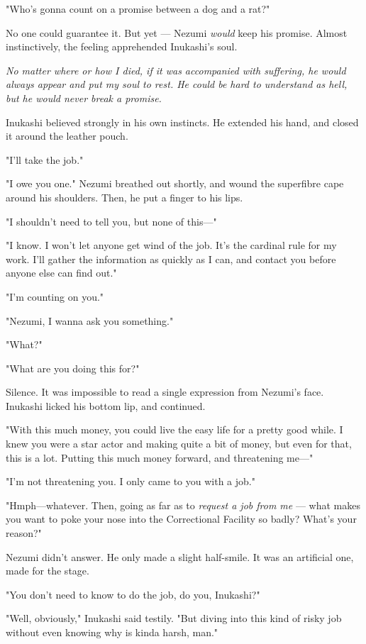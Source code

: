 "Who's gonna count on a promise between a dog and a rat?"

No one could guarantee it. But yet --- Nezumi \emph{would} keep his promise.
Almost instinctively, the feeling apprehended Inukashi's soul.

\emph{No matter where or how I died, if it was accompanied with suffering, he
would always appear and put my soul to rest. He could be hard to
understand as hell, but he would never break a promise.}

Inukashi believed strongly in his own instincts. He extended his hand,
and closed it around the leather pouch.

"I'll take the job."

"I owe you one." Nezumi breathed out shortly, and wound the superfibre
cape around his shoulders. Then, he put a finger to his lips.

"I shouldn't need to tell you, but none of this---"

"I know. I won't let anyone get wind of the job. It's the cardinal rule
for my work. I'll gather the information as quickly as I can, and
contact you before anyone else can find out."

"I'm counting on you."

"Nezumi, I wanna ask you something."

"What?"

"What are you doing this for?"

Silence. It was impossible to read a single expression from Nezumi's
face. Inukashi licked his bottom lip, and continued.

"With this much money, you could live the easy life for a pretty good
while. I knew you were a star actor and making quite a bit of money, but
even for that, this is a lot. Putting this much money forward, and
threatening me---"

"I'm not threatening you. I only came to you with a job."

"Hmph---whatever. Then, going as far as to \emph{request a job from me} --- what
makes you want to poke your nose into the Correctional Facility so
badly? What's your reason?"

Nezumi didn't answer. He only made a slight half-smile. It was an
artificial one, made for the stage.

"You don't need to know to do the job, do you, Inukashi?"

"Well, obviously," Inukashi said testily. "But diving into this kind of
risky job without even knowing why is kinda harsh, man."

